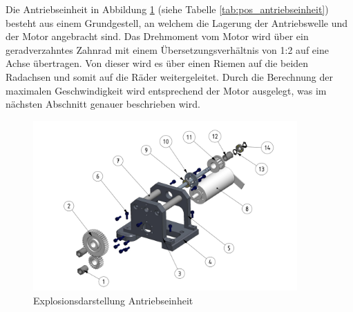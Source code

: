 \documentclass[../../main.tex]{subfiles}
\begin{document}
    \newpage

    Die Antriebseinheit in Abbildung \ref{fig:antriebseinheit} (siehe Tabelle \ref{tab:pos_antriebseinheit}) besteht aus einem Grundgestell, an welchem die Lagerung der Antriebswelle und der Motor angebracht sind. Das Drehmoment vom Motor wird über ein geradverzahntes Zahnrad mit einem Übersetzungsverhältnis von 1:2 auf eine Achse übertragen. Von dieser wird es über einen Riemen auf die beiden Radachsen und somit auf die Räder weitergeleitet. Durch die Berechnung der maximalen Geschwindigkeit wird entsprechend der Motor ausgelegt, was im nächsten Abschnitt genauer beschrieben wird.\\

    \begin{figure}[H] %
        \centering
        \includegraphics[width=0.9\textwidth]{antriebseinheit.png}
        \caption{Explosionsdarstellung Antriebseinheit}
        \label{fig:antriebseinheit}
    \end{figure}
\end{document}
